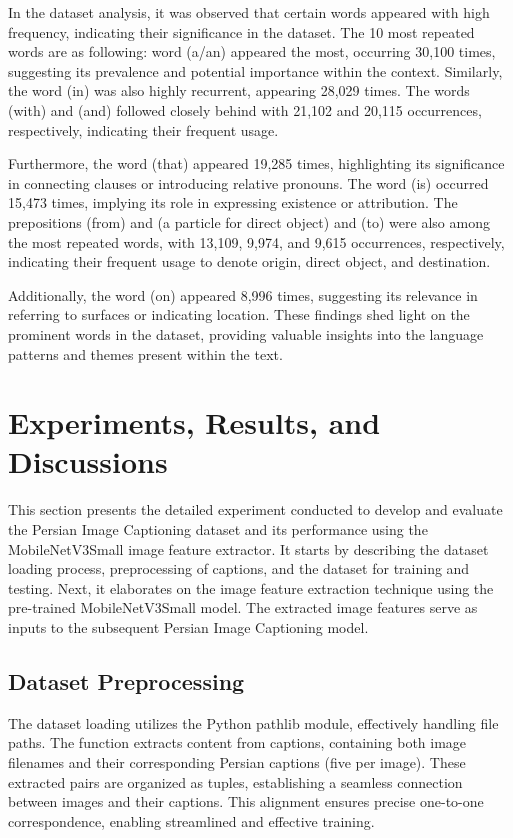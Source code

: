 \documentclass[lettersize,journal]{IEEEtran}
\begin{document}
In the dataset analysis, it was observed that certain words appeared with high frequency, indicating their significance in the dataset. The 10 most repeated words are as following: word (a/an) appeared the most, occurring 30,100 times, suggesting its prevalence and potential importance within the context. Similarly, the word (in) was also highly recurrent, appearing 28,029 times. The words (with) and (and) followed closely behind with 21,102 and 20,115 occurrences, respectively, indicating their frequent usage.

Furthermore, the word (that) appeared 19,285 times, highlighting its significance in connecting clauses or introducing relative pronouns. The word (is) occurred 15,473 times, implying its role in expressing existence or attribution. The prepositions (from) and (a particle for direct object) and (to) were also among the most repeated words, with 13,109, 9,974, and 9,615 occurrences, respectively, indicating their frequent usage to denote origin, direct object, and destination.

Additionally, the word (on) appeared 8,996 times, suggesting its relevance in referring to surfaces or indicating location. These findings shed light on the prominent words in the dataset, providing valuable insights into the language patterns and themes present within the text.

\section{Experiments, Results, and Discussions}

This section presents the detailed experiment conducted to develop and evaluate the Persian Image Captioning dataset and its performance using the MobileNetV3Small image feature extractor. It starts by describing the dataset loading process, preprocessing of captions, and the dataset for training and testing. Next, it elaborates on the image feature extraction technique using the pre-trained MobileNetV3Small model. The extracted image features serve as inputs to the subsequent Persian Image Captioning model.

\subsection{Dataset Preprocessing}
The dataset loading utilizes the Python pathlib module, effectively handling file paths. The function extracts content from captions, containing both image filenames and their corresponding Persian captions (five per image). These extracted pairs are organized as tuples, establishing a seamless connection between images and their captions. This alignment ensures precise one-to-one correspondence, enabling streamlined and effective training.
\end{document}
